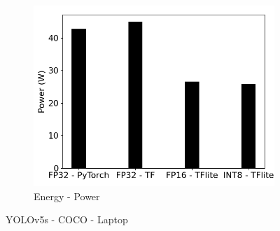 \begin{figure}[]
\begin{subfigure}{0.19\textwidth}
        \includegraphics[width=1\textwidth]{other/figures/YOLOv5s_COCO_Laptop/Power.png}
        \caption{Energy - Power}
    \end{subfigure}
    \caption{YOLOv5s - COCO - Laptop}
    \label{fig:yolo-coco-laptop}
\end{figure}

